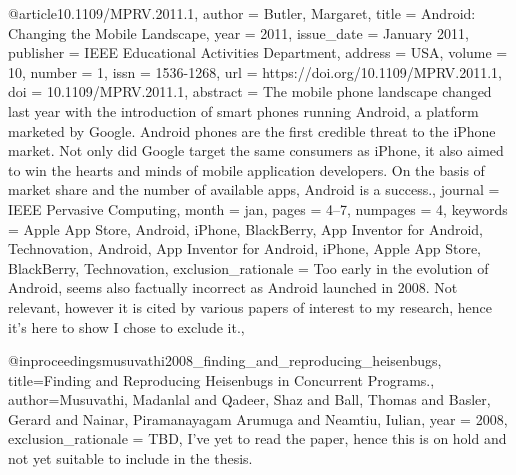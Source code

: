 @article{10.1109/MPRV.2011.1,
    author = {Butler, Margaret},
    title = {Android: Changing the Mobile Landscape},
    year = {2011},
    issue_date = {January 2011},
    publisher = {IEEE Educational Activities Department},
    address = {USA},
    volume = {10},
    number = {1},
    issn = {1536-1268},
    url = {https://doi.org/10.1109/MPRV.2011.1},
    doi = {10.1109/MPRV.2011.1},
    abstract = {The mobile phone landscape changed last year with the introduction of smart phones
    running Android, a platform marketed by Google. Android phones are the first credible
    threat to the iPhone market. Not only did Google target the same consumers as iPhone,
    it also aimed to win the hearts and minds of mobile application developers. On the
    basis of market share and the number of available apps, Android is a success.},
    journal = {IEEE Pervasive Computing},
    month = jan,
    pages = {4–7},
    numpages = {4},
    keywords = {Apple App Store, Android, iPhone, BlackBerry, App Inventor for Android, Technovation, Android, App Inventor for Android, iPhone, Apple App Store, BlackBerry, Technovation},
    exclusion_rationale = {Too early in the evolution of Android, seems also factually incorrect as Android launched in 2008. Not relevant, however it is cited by various papers of interest to my research, hence it's here to show I chose to exclude it.},
}

@inproceedings{musuvathi2008_finding_and_reproducing_heisenbugs,
  title={Finding and Reproducing Heisenbugs in Concurrent Programs.},
  author={Musuvathi, Madanlal and Qadeer, Shaz and Ball, Thomas and Basler, Gerard and Nainar, Piramanayagam Arumuga and Neamtiu, Iulian},
  year = {2008},
  exclusion_rationale = {TBD, I've yet to read the paper, hence this is on hold and not yet suitable to include in the thesis.}
}

